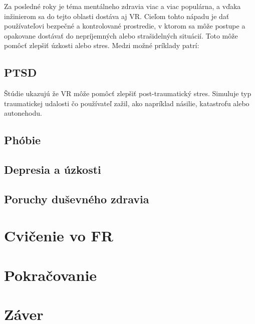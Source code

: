 \documentclass[10pt,twoside,slovak,a4paper]{article}
\begin{document}
Za posledné roky je téma mentálneho zdravia viac a viac populárna, a vďaka inžinierom sa do tejto oblasti dostáva aj VR. Cieľom tohto nápadu je dať používateľovi bezpečné a kontrolované prostredie, v ktorom sa môže postupe a opakovane dostávať do nepríjemných alebo strašidelných situácií. Toto môže pomôcť zlepšiť úzkosti alebo stres.
Medzi možné príklady patrí:
\subsection{PTSD} \label{PTSD}
Štúdie ukazujú že VR môže pomôcť zlepšiť post-traumatický stres. Simuluje typ traumatickej udalosti čo používateľ zažil, ako napríklad násilie, katastrofu alebo autonehodu.
\subsection{Phóbie}\label{Phobias}
\subsection{Depresia a úzkosti}\label{Depression}
\subsection{Poruchy duševného zdravia}\label{Disorders}

\section{Cvičenie vo FR}\label{workout}
\section{Pokračovanie}







\section{Záver} \label{zaver} %






\end{document}
